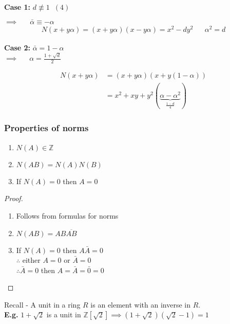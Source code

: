 \documentclass[11pt]{article}
\begin{document}
\newpage
\textbf{Case 1:} $d \not \equiv 1 \hspace{7pt} (4) $

$\implies \hspace{19pt}\bar \alpha \equiv - \alpha$
\begin{align*}
	N(x+y\alpha) = (x+y\alpha)(x-y\alpha) = x^2 - dy^2 &&\alpha^2 = d 
\end{align*}

\textbf{Case 2:} $\bar \alpha = 1 - \alpha $\\
$\implies \hspace{18pt} \alpha = \frac{1+\sqrt{d}}{2} $

\begin{align*}
	N(x+y\alpha) &= (x+y\alpha)(x+y(1-\alpha))\\
	&= x^2 + xy + y^2(\underbrace{\alpha - \alpha^2}_{\frac{1-d}{4}}) 
\end{align*}

	
\subsubsection{Properties of norms}
	
	
\begin{enumerate}
	\item{$N(A) \in \mathbb{Z}$}
	\item{$N(AB) = N(A)N(B) $}
	\item{If $N(A) = 0 $ then $A=0$}
\end{enumerate}
\begin{proof} $ $\\
	\begin{enumerate}
		\item{Follows from formulas for norms}
		\item{$N(AB) = AB \overline{AB}$}
		\item{If $N(A) = 0$ then $A \bar A =0$\\
			\hspace{76pt} $\therefore $ either $A=0 $ or $\bar A = 0$\\
			\hspace{76pt} $\therefore \bar A = 0 $ then $A = \bar A = \bar 0 = 0$  }
	\end{enumerate}
\end{proof}


Recall - A unit in a ring $R$ is an element with an inverse in $R$.\\[1em]

\textbf{E.g.} $1+\sqrt{2} $ is a unit in $\mathbb{Z}[\sqrt{2}] \implies (1+\sqrt{2})(\sqrt{2} -1) = 1$
\end{document}
